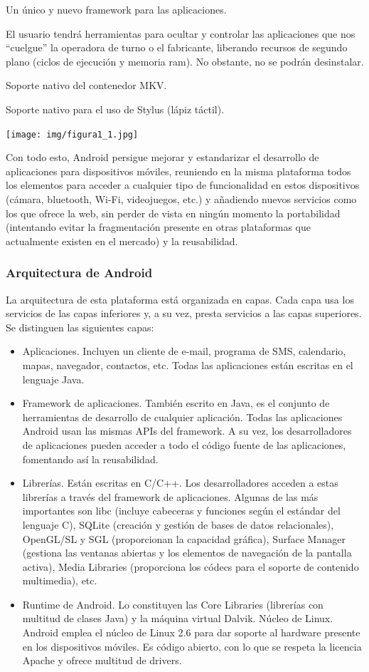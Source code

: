 \documentclass[12 pt, a4paper, twoside]{article}
\begin{document}
Un único y nuevo framework para las aplicaciones.

El usuario tendrá herramientas para ocultar y controlar las
aplicaciones que nos ``cuelgue'' la operadora de turno o el
fabricante, liberando recursos de segundo plano (ciclos de ejecución y
memoria ram). No obstante, no se podrán desinstalar.

Soporte nativo del contenedor MKV.

Soporte nativo para el uso de Stylus (lápiz táctil).

\begin{center}
  \texttt{[image: img/figura1\_1.jpg]}
\end{center}

Con todo esto, Android persigue mejorar y estandarizar el desarrollo de aplicaciones
para dispositivos móviles, reuniendo en la misma plataforma todos los
elementos para acceder a cualquier tipo de funcionalidad en estos dispositivos
(cámara, bluetooth, Wi-Fi, videojuegos, etc.) y añadiendo nuevos servicios como
los que ofrece la web, sin perder de vista en ningún momento la portabilidad
(intentando evitar la fragmentación presente en otras plataformas que actualmente
existen en el mercado) y la reusabilidad.

\subsubsection{Arquitectura de Android}
La arquitectura de esta plataforma está organizada en capas. Cada capa usa los
servicios de las capas inferiores y, a su vez, presta servicios a las capas superiores.
Se distinguen las siguientes capas:
\begin{itemize}
\item Aplicaciones. Incluyen un cliente de e-mail, programa de SMS, calendario,
mapas, navegador, contactos, etc. Todas las aplicaciones están escritas en el
lenguaje Java.
\item Framework de aplicaciones. También escrito en Java, es el conjunto de
herramientas de desarrollo de cualquier aplicación. Todas las aplicaciones
Android usan las mismas APIs del framework. A su vez, los desarrolladores
de aplicaciones pueden acceder a todo el código fuente de las aplicaciones,
fomentando así la reusabilidad.
\item Librerías. Están escritas en C/C++. Los desarrolladores acceden a estas
librerías a través del framework de aplicaciones. Algunas de las más importantes
son libc (incluye cabeceras y funciones según el estándar del lenguaje
C), SQLite (creación y gestión de bases de datos relacionales), OpenGL/SL
y SGL (proporcionan la capacidad gráfica), Surface Manager (gestiona las
ventanas abiertas y los elementos de navegación de la pantalla activa), Media
Libraries (proporciona los códecs para el soporte de contenido multimedia),
etc.
\item Runtime de Android. Lo constituyen las Core Libraries (librerías con
multitud de clases Java) y la máquina virtual Dalvik.
Núcleo de Linux. Android emplea el núcleo de Linux 2.6 para dar soporte
al hardware presente en los dispositivos móviles. Es código abierto, con lo
que se respeta la licencia Apache y ofrece multitud de drivers.
\end{itemize}
\end{document}
